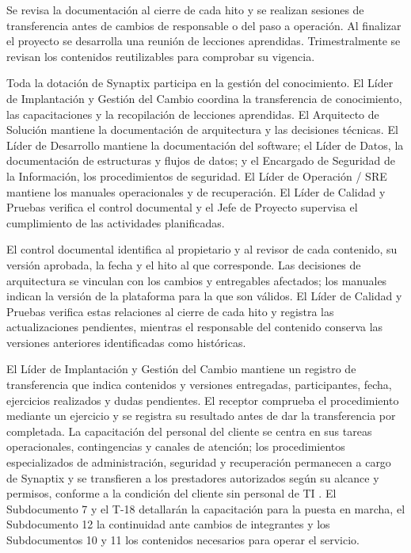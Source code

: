 Se revisa la documentación al cierre de cada hito y se realizan
sesiones de transferencia antes de cambios de responsable o del paso
a operación. Al finalizar el proyecto se desarrolla una reunión de
lecciones aprendidas. Trimestralmente se revisan los contenidos
reutilizables para comprobar su vigencia.

Toda la dotación de Synaptix participa en la gestión del conocimiento. El Líder de Implantación y Gestión del Cambio coordina la transferencia
de conocimiento, las capacitaciones y la recopilación de lecciones
aprendidas. El Arquitecto de Solución mantiene la documentación de
arquitectura y las decisiones técnicas. El Líder de Desarrollo
mantiene la documentación del software; el Líder de Datos, la
documentación de estructuras y flujos de datos; y el Encargado de
Seguridad de la Información, los procedimientos de seguridad.
El Líder de Operación / SRE mantiene los manuales operacionales y de
recuperación. El Líder de Calidad y Pruebas verifica el control documental y
el Jefe de Proyecto supervisa el cumplimiento de las actividades
planificadas.

El control documental identifica al propietario y al revisor de cada contenido, su versión aprobada, la fecha y el hito al que corresponde. Las decisiones de arquitectura se vinculan con los cambios y entregables afectados; los manuales indican la versión de la plataforma para la que son válidos. El Líder de Calidad y Pruebas verifica estas relaciones al cierre de cada hito y registra las actualizaciones pendientes, mientras el responsable del contenido conserva las versiones anteriores identificadas como históricas.

El Líder de Implantación y Gestión del Cambio mantiene un registro de transferencia que indica contenidos y versiones entregadas, participantes, fecha, ejercicios realizados y dudas pendientes. El receptor comprueba el procedimiento mediante un ejercicio y se registra su resultado antes de dar la transferencia por completada. La capacitación del personal del cliente se centra en sus tareas operacionales, contingencias y canales de atención; los procedimientos especializados de administración, seguridad y recuperación permanecen a cargo de Synaptix y se transfieren a los prestadores autorizados según su alcance y permisos, conforme a la condición del cliente sin personal de TI \parencite[cap.~10, restricción~7]{caso07}. El Subdocumento 7 y el T-18 detallarán la capacitación para la puesta en marcha, el Subdocumento 12 la continuidad ante cambios de integrantes y los Subdocumentos 10 y 11 los contenidos necesarios para operar el servicio.




